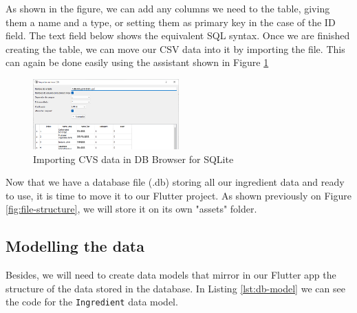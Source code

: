 As shown in the figure, we can add any columns we need to the table, giving them a name and a type, or setting them as primary key in the case of the ID field. The text field below shows the equivalent SQL syntax. Once we are finished creating the table, we can move our CSV data into it by importing the file. This can again be done easily using the assistant shown in Figure \ref{fig:db4s-import}

\begin{figure}[h]
  \centering
  \includegraphics[width=0.50\textwidth]{Figures/db4s-import.png}
  \caption{
   Importing CVS data in DB Browser for SQLite
  }
  \label{fig:db4s-import}
\end{figure}

Now that we have a database file (.db) storing all our ingredient data and ready to use, it is time to move it to our Flutter project. As shown previously on Figure \ref{fig:file-structure}, we will store it on its own "assets" folder.

\subsection{Modelling the data}

Besides, we will need to create data models that mirror in our Flutter app the structure of the data stored in the database. In Listing \ref{lst:db-model} we can see the code for the \texttt{Ingredient} data model.

